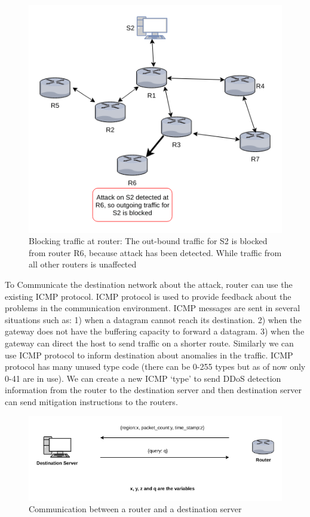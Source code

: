 \documentclass[12pt,oneside,a4paper]{article}
\begin{document}
\begin{figure}[H]
\centering
\includegraphics[scale=0.60]{mitigation_path}
\caption{Blocking traffic at router: The out-bound traffic for S2 is blocked from router R6,
because attack has been detected. While traffic from all other routers is unaffected} \label{fig:mitigation_path}
\end{figure}

To Communicate the destination network about the attack, router can use the existing ICMP protocol. ICMP protocol is used to provide feedback about the problems in the communication environment. ICMP messages are sent in several situations such as: 1) when a datagram cannot reach its destination. 2) when the gateway does not have the buffering capacity to forward a datagram. 3) when the gateway can direct the host to send traffic on a shorter route.\cite{icmp} Similarly we can use ICMP protocol to inform destination about anomalies in the traffic. ICMP protocol has many unused type code (there can be 0-255 types but as of now only 0-41 are in use). We can create a new ICMP `type' to send DDoS detection information from the router to the destination server and then destination server can send mitigation instructions to the routers.

\begin{figure}[H]
\centering
\includegraphics[scale=0.5]{router-network-communication}
\caption{Communication between a router and a destination server} \label{fig:router-network-communication}
\end{figure}
\pagebreak
\end{document}
